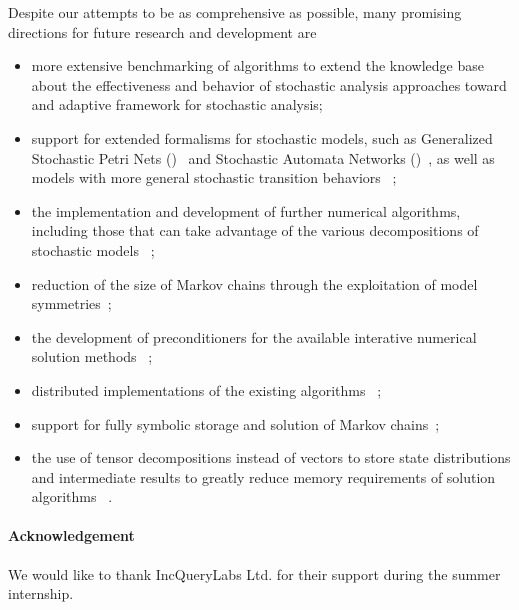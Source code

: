 Despite our attempts to be as comprehensive as possible, many
promising directions for future research and development are
\begin{itemize}
\item more extensive benchmarking of algorithms to extend the
  knowledge base about the effectiveness and behavior of stochastic
  analysis approaches toward and adaptive framework for stochastic
  analysis;
\item support for extended formalisms for stochastic models, such as
  Generalized Stochastic Petri Nets ()~%
  \citep{DBLP:journals/tse/TeruelFP03} and Stochastic Automata Networks
  ()~\citep{DBLP:conf/pnpm/1985}, as well as models with
  more general stochastic transition behaviors~%
  \citep{Longo:2015:TSR:2767455.2767457};
\item the implementation and development of further numerical
  algorithms, including those that can take advantage of the various
  decompositions of stochastic models~%
  \citep{buchholz1999structured,buchholz2000multilevel,%
    dayar2012analyzing};
\item reduction of the size of Markov chains through the exploitation
  of model symmetries~\citep{buchholz1994exact,haddad1995evaluation};
\item the development of preconditioners for the available interative
  numerical solution methods~%
  \citep{DBLP:journals/informs/LangvilleS04};
\item distributed implementations of the existing algorithms~%
  \citep{DBLP:conf/imcsit/BylinaB08};
\item support for fully symbolic storage and solution of Markov
  chains~\citep{DBLP:journals/sigmetrics/CiardoM05,%
  DBLP:conf/qest/ZhaoC12,DBLP:conf/qest/2012};
\item the use of tensor decompositions instead of vectors to store
  state distributions and intermediate results to greatly reduce
  memory requirements of solution algorithms~%
  \citep{grasedyck2013literature,ballani2013projection,%
  dolgov2013tt}.
\end{itemize}

\paragraph{Acknowledgement} We would like to thank IncQueryLabs
Ltd. for their support during the summer internship.
